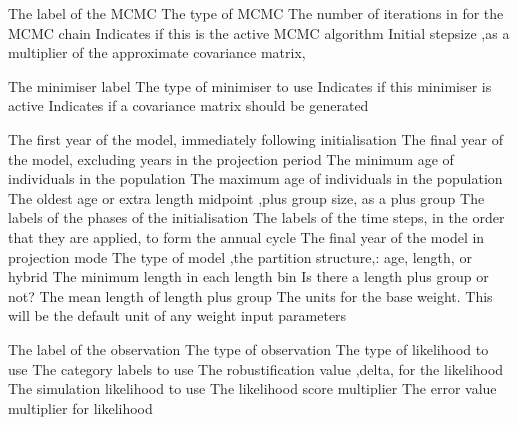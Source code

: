  {The label of the MCMC}
 {The type of MCMC}
 {The number of iterations in for the MCMC chain}
 {Indicates if this is the active MCMC algorithm}
 {Initial stepsize ,as a multiplier of the approximate covariance matrix,}
\par\par
{} {The minimiser label}
 {The type of minimiser to use}
 {Indicates if this minimiser is active}
 {Indicates if a covariance matrix should be generated}
\par\par
{} {The first year of the model, immediately following initialisation}
 {The final year of the model, excluding years in the projection period}
 {The minimum age of individuals in the population}
 {The maximum age of individuals in the population}
 {The oldest age or extra length midpoint ,plus group size, as a plus group}
 {The labels of the phases of the initialisation}
 {The labels of the time steps, in the order that they are applied, to form the annual cycle}
 {The final year of the model in projection mode}
 {The type of model ,the partition structure,: age, length, or hybrid}
 {The minimum length in each length bin}
 {Is there a length plus group or not?}
 {The mean length of length plus group}
 {The units for the base weight. This will be the default unit of any weight input parameters}
\par\par
{} {The label of the observation}
 {The type of observation}
 {The type of likelihood to use}
 {The category labels to use}
 {The robustification value ,delta, for the likelihood}
 {The simulation likelihood to use}
 {The likelihood score multiplier}
 {The error value multiplier for likelihood}
\par\textbf{}\par
